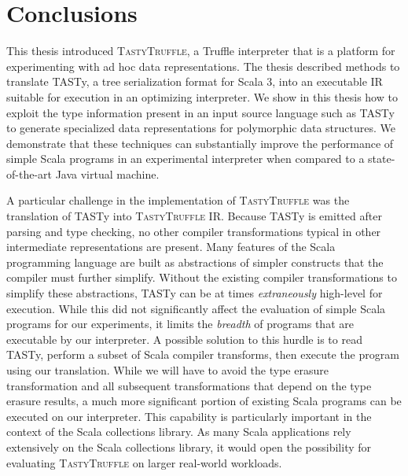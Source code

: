 \chapter{Conclusions}

This thesis introduced \textsc{TastyTruffle}, a Truffle interpreter that is a platform for experimenting with ad hoc data representations.
The thesis described methods to translate TASTy, a tree serialization format for Scala 3, into an executable IR suitable for execution in an optimizing interpreter.
We show in this thesis how to exploit the type information present in an input source language such as TASTy to generate specialized data representations for polymorphic data structures.
We demonstrate that these techniques can substantially improve the performance of simple Scala programs in an experimental interpreter when compared to a state-of-the-art Java virtual machine.

A particular challenge in the implementation of \textsc{TastyTruffle} was the translation of TASTy into \textsc{TastyTruffle} IR.
Because TASTy is emitted after parsing and type checking, no other compiler transformations typical in other intermediate representations are present.
Many features of the Scala programming language are built as abstractions of simpler constructs that the compiler must further simplify.
Without the existing compiler transformations to simplify these abstractions, TASTy can be at times \textit{extraneously} high-level for execution.
While this did not significantly affect the evaluation of simple Scala programs for our experiments, it limits the \textit{breadth} of programs that are executable by our interpreter.
A possible solution to this hurdle is to read TASTy, perform a subset of Scala compiler transforms, then execute the program using our translation.
While we will have to avoid the type erasure transformation and all subsequent transformations that depend on the type erasure results, a much more significant portion of existing Scala programs can be executed on our interpreter. 
This capability is particularly important in the context of the Scala collections library. 
As many Scala applications rely extensively on the Scala collections library, it would open the possibility for evaluating \textsc{TastyTruffle} on larger real-world workloads.

